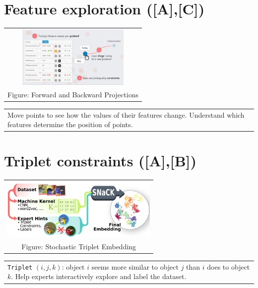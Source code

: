\documentclass[portrait,final,a0paper]{nadiposter}
\newcommand{\pointer}{\scalebox{1.0}{\ding{43}}}%
\begin{document}
\begin{poster}
{\begin{multicols}{3}
    \section*{\small{Feature exploration (\small{[A],[C]})}}
    \begin{center}
        \begin{tabular}{c}
            \includegraphics[height=8em]{poster_NADI_2018/images/eg_forward_backward.png}\\
            \tiny{Figure: Forward and Backward Projections \cite{cavallo2017FWBW}}
        \end{tabular}
        \begin{tabular}{p{20em}}
            \quad Move points to see how the values of their features change.
            \pointer
            Understand which features determine the position of points.%
        \end{tabular}
    \end{center}

    \section*{\small{Triplet constraints (\small{[A],[B]})}}
    \begin{center}
        \begin{tabular}{c}
            \includegraphics[height=8em]{poster_NADI_2018/images/eg_triplet.png}\\
            \tiny{Figure: Stochastic Triplet Embedding \cite{van2012ste}}
        \end{tabular}
        \begin{tabular}{p{22em}}
            \quad\texttt{Triplet} $(i, j, k)$: object $i$ seems more similar to object $j$ than $i$ does to object $k$.
            \pointer
            Help experts interactively explore and label the dataset.
        \end{tabular}
    \end{center}


\end{multicols}}
\end{poster}
\end{document}
